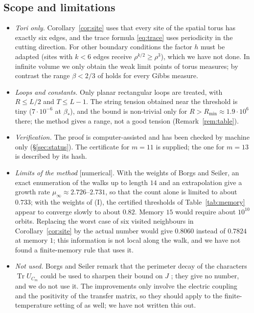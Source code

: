 \documentclass[11pt,a4paper]{article}
\theoremstyle{plain}
\theoremstyle{remark}
\numberwithin{equation}{section}
\newcommand{\Tr}{\operatorname{Tr}}
\newcommand{\st}[1]{\textsf{[#1]}}
\begin{document}
\subsection{Scope and limitations}\label{sec:scope}
\begin{itemize}
\item \emph{Tori only.} Corollary~\ref{cor:site} uses that every site of the spatial torus has exactly six edges, and the trace
formula \eqref{eq:trace} uses periodicity in the cutting direction. For other boundary conditions the factor $h$ must be adapted
(sites with $k<6$ edges receive $\rho^{k/2}\ge\rho^3$), which we have not done. In infinite volume we only obtain the weak limit
points of torus measures; by contrast the range $\beta<2/3$ of \cite[Thm.~7.1]{D7} holds for every Gibbs measure.
\item \emph{Loops and constants.} Only planar rectangular loops are treated, with $R\le L/2$ and $T\le L-1$. The string tension
obtained near the threshold is tiny ($7\cdot10^{-6}$ at $\beta_*$), and the bound is non-trivial only for $R>R_{\min}\approx1.9\cdot10^6$ there; the
method gives a range, not a good tension (Remark~\ref{rem:table}).
\item \emph{Verification.} The proof is computer-assisted and has been checked by machine only (\S\ref{sec:status}). The
certificate for $m=11$ is supplied; the one for $m=13$ is described by its hash.
\item \emph{Limits of the method} \st{numerical}. With the weights of Borgs and Seiler, an exact enumeration of the walks up to length
$14$ and an extrapolation give a growth rate $\mu_\infty\approx2.726$--$2.731$, so that the count alone is limited to about $0.733$;
with the weights of (I), the certified thresholds of Table~\ref{tab:memory} appear to converge slowly to about $0.82$. Memory $15$
would require about $10^{10}$ orbits. Replacing the worst case of six visited neighbours in Corollary~\ref{cor:site} by the actual
number would give $0.8060$ instead of $0.7824$ at memory $1$; this information is not local along the walk, and we have not found a
finite-memory rule that uses it.
\item \emph{Not used.} Borgs and Seiler remark that the perimeter decay of the characters $\Tr U_{C_m}$ could be used to sharpen
their bound on $J$ \cite[second (B.14), p.~377]{BS83}; they give no number, and we do not use it. The improvements
only involve the electric coupling and the positivity of the transfer matrix, so they should apply to the finite-temperature setting
of \cite{BS83} as well; we have not written this out.
\end{itemize}
\end{document}
